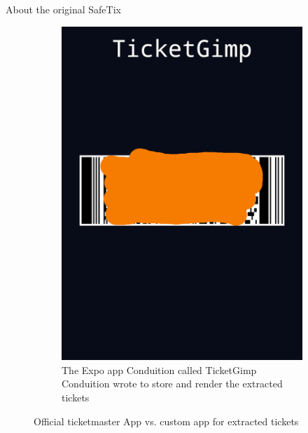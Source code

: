 \documentclass[final,dvipsnames]{beamer}
\newlength{\colwidth}
\begin{document}
\begin{frame}[t, fragile]
\begin{columns}[t]
\begin{column}{\colwidth}
\begin{block}{About the original SafeTix}
\begin{figure}[h]
\begin{subfigure}{.5\textwidth}
                \label{fig:app_barcode}
            \end{subfigure}%
            \begin{subfigure}{.5\textwidth}
                \centering
                \includegraphics[width=1\linewidth]{figures/Conduition_custom_ticket_app.png}
                \caption{The Expo app Conduition called TicketGimp Conduition wrote to store and render the extracted tickets \cite{reverse_engineering_ticketmaster}}
                \label{fig:conduition_custom_app}
            \end{subfigure}
            \caption{Official ticketmaster App vs. custom app for extracted tickets}
        \end{figure}
    \end{block}


\end{column}
\end{columns}
\end{frame}
\end{document}
